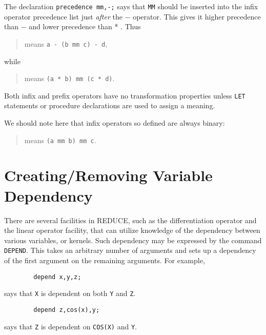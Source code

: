 \documentclass[11pt,letterpaper]{book}
\makeatletter
\newcommand{\REDUCE}{REDUCE}
\newcommand{\underscore}{\_}
\newcommand{\ttindex}[1]{{\renewcommand{\_}{\protect\underscore}%
                          \index{#1@{\tt #1}}}}
\makeatother
\begin{document}
The declaration {\tt precedence mm,-;} says that {\tt MM} should be
inserted into the infix operator precedence list just {\em after\/}
the $-$ operator.  This gives it higher precedence than $-$ and lower
precedence than * .  Thus

\begin{quote}
\hspace{0.2in}{\tt a - b mm c - d}\hspace{.3in} means \hspace{.3in}
{\tt a - (b mm c) - d},
\end{quote}
while
\begin{quote}
\hspace{0.2in}{\tt   a * b mm c * d}\hspace{.3in} means \hspace{.3in}
{\tt (a * b) mm (c * d)}.
\end{quote}

Both infix and prefix operators have no transformation
properties unless {\tt LET}\ttindex{LET} statements or procedure
declarations are used to assign a meaning.

We should note here that infix operators so defined are always binary:
\begin{quote}
\hspace{0.2in}{\tt a mm b mm c}\hspace{.3in} means \hspace{.3in}
{\tt (a mm b) mm c}.
\end{quote}

\section{Creating/Removing Variable Dependency}

There are several facilities in {\REDUCE}, such as the differentiation
operator and the linear operator facility, that
can utilize knowledge of the dependency between various variables, or
kernels.  Such dependency may be expressed by the command {\tt
DEPEND}.\ttindex{DEPEND} This takes an arbitrary number of arguments and
sets up a dependency of the first argument on the remaining arguments.
For example,
{\small\begin{verbatim}
        depend x,y,z;
\end{verbatim}}
says that {\tt X} is dependent on both {\tt Y} and {\tt Z}.
{\small\begin{verbatim}
        depend z,cos(x),y;
\end{verbatim}}
says that {\tt Z} is dependent on {\tt COS(X)} and {\tt Y}.
\end{document}
